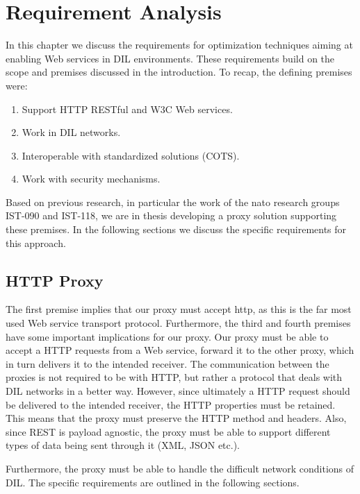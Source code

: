 \chapter{Requirement Analysis}
\label{chapter:requirements}

In this chapter we discuss the requirements for optimization techniques aiming
at enabling Web services in DIL environments. These requirements build on the
scope and premises discussed in the introduction. To recap, the defining
premises were:

\begin{enumerate}
    \item Support HTTP RESTful and W3C Web services.
    \item Work in DIL networks.
    \item Interoperable with standardized solutions (COTS).
    \item Work with security mechanisms.
\end{enumerate}

Based on previous research, in particular the work of the \gls{nato} research
groups IST-090 and IST-118, we are in thesis developing a proxy solution
supporting these premises. In the following sections we discuss the specific
requirements for this approach.

\section{HTTP Proxy}

The first premise implies that our proxy must accept \gls{http}, as this is the
far most used Web service transport protocol. Furthermore, the third and fourth premises
have some important implications for our proxy. Our proxy must be able
to accept a HTTP requests from a Web service, forward it to the other proxy,
which in turn delivers it to the intended receiver. The communication between
the proxies is not required to be with HTTP, but rather a protocol that deals
with DIL networks in a better way. However, since ultimately a HTTP request
should be delivered to the intended receiver, the HTTP properties must be
retained. This means that the proxy must preserve the HTTP method and headers.
Also, since REST is payload agnostic, the proxy must be able to support
different types of data being sent through it (XML, JSON etc.).

Furthermore, the proxy must be able to handle the difficult network conditions
of DIL. The specific requirements are outlined in the following sections.

